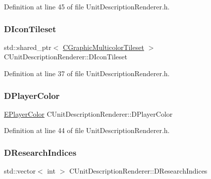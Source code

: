 Definition at line 45 of file Unit\+Description\+Renderer.\+h.

\hypertarget{classCUnitDescriptionRenderer_aadf76b5c018d76c3ff7bd8edc021d702}{}\label{classCUnitDescriptionRenderer_aadf76b5c018d76c3ff7bd8edc021d702} 
\subsubsection{\texorpdfstring{D\+Icon\+Tileset}{DIconTileset}}
{\footnotesize\ttfamily std\+::shared\+\_\+ptr$<$ \hyperlink{classCGraphicMulticolorTileset}{C\+Graphic\+Multicolor\+Tileset} $>$ C\+Unit\+Description\+Renderer\+::\+D\+Icon\+Tileset\hspace{0.3cm}{\ttfamily [protected]}}



Definition at line 37 of file Unit\+Description\+Renderer.\+h.

\hypertarget{classCUnitDescriptionRenderer_af2214b623c3b34eb4d6db9afc841b7a2}{}\label{classCUnitDescriptionRenderer_af2214b623c3b34eb4d6db9afc841b7a2} 
\subsubsection{\texorpdfstring{D\+Player\+Color}{DPlayerColor}}
{\footnotesize\ttfamily \hyperlink{GameDataTypes_8h_aafb0ca75933357ff28a6d7efbdd7602f}{E\+Player\+Color} C\+Unit\+Description\+Renderer\+::\+D\+Player\+Color\hspace{0.3cm}{\ttfamily [protected]}}



Definition at line 44 of file Unit\+Description\+Renderer.\+h.

\hypertarget{classCUnitDescriptionRenderer_aa34762a0be929d92ac9f0b151e3e3187}{}\label{classCUnitDescriptionRenderer_aa34762a0be929d92ac9f0b151e3e3187} 
\subsubsection{\texorpdfstring{D\+Research\+Indices}{DResearchIndices}}
{\footnotesize\ttfamily std\+::vector$<$ int $>$ C\+Unit\+Description\+Renderer\+::\+D\+Research\+Indices\hspace{0.3cm}{\ttfamily [protected]}}



